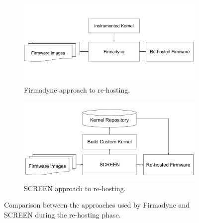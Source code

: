 \begin{figure}[h]
     \centering
     \begin{subfigure}[b]{0.45\textwidth}
         \centering
         \includegraphics[width=\textwidth]{sebseg/Firmadyne-Approach.pdf}
         \caption{Firmadyne approach to re-hosting.}
         \label{fig:firmadyne-approach}
     \end{subfigure}
     \hfill
     \begin{subfigure}[b]{0.45\textwidth}
         \centering
         \includegraphics[width=\textwidth]{sebseg/SCREEN-Approach.pdf}
         \caption{SCREEN approach to re-hosting.}
         \label{fig:screen-approach}
     \end{subfigure}
        \caption{Comparison between the approaches used by Firmadyne and SCREEN during the re-hosting phase.}
        \label{fig:firmadyne-screen-compare}
\end{figure}